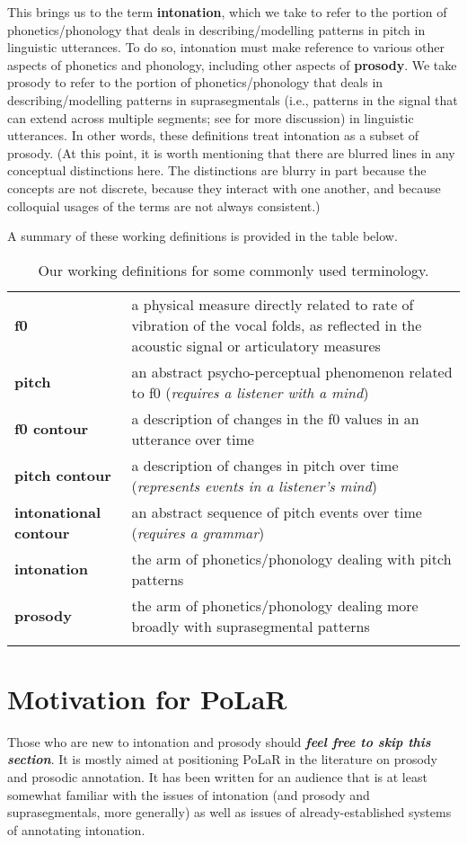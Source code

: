 This brings us to the term \textbf{intonation}, which we take to refer to the portion of phonetics\slash phonology that deals in describing\slash modelling patterns in pitch in linguistic utterances. To do so, intonation must make reference to various other aspects of phonetics and phonology, including other aspects of \textbf{prosody}. We take prosody to refer to the portion of phonetics\slash phonology that deals in describing\slash modelling patterns in suprasegmentals (i.e., patterns in the signal that can extend across multiple segments; see \citealt{lehiste70} for more discussion) in linguistic utterances. In other words, these definitions treat intonation as a subset of prosody. (At this point, it is worth mentioning that there are blurred lines in any conceptual distinctions here. The distinctions are blurry in part because the concepts are not discrete, because they interact with one another, and because colloquial usages of the terms are not always consistent.)

A summary of these working definitions is provided in the table below.

\begin{longtable}{>{\bfseries}p{.175\linewidth}p{.75\linewidth}} \endhead\toprule 
f0 &
a physical measure directly related to rate of vibration of the vocal folds, as reflected in the acoustic signal or articulatory measures
\tabularnewline\hdashline
pitch &
an abstract psycho-perceptual phenomenon related to f0 (\textit{requires a listener with a mind})
\tabularnewline\hdashline
f0 contour &
a description of changes in the f0 values in an utterance over time
\tabularnewline\hdashline
pitch contour &
a description of changes in pitch over time (\textit{represents events in a listener’s mind})
\tabularnewline\hdashline
intonational contour &
an abstract sequence of pitch events over time (\textit{requires a grammar})
\tabularnewline\hdashline
intonation &
the arm of phonetics\slash phonology dealing with pitch patterns
\tabularnewline\hdashline
prosody &
the arm of phonetics\slash phonology dealing more broadly with suprasegmental patterns
\tabularnewline\bottomrule 
\caption{Our working definitions for some commonly used terminology.
\label{tab:terminology}
}
\end{longtable}


\section{Motivation for PoLaR}
Those who are new to intonation and prosody should \textit{\textbf{feel free to skip this section}}. It is mostly aimed at positioning PoLaR in the literature on prosody and prosodic annotation. It has been written for an audience that is at least somewhat familiar with the issues of intonation (and prosody and suprasegmentals, more generally) as well as issues of already-established systems of annotating intonation.

